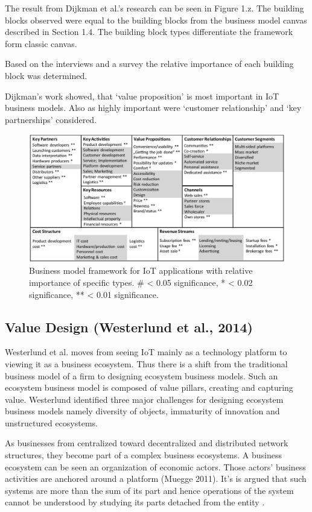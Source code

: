 		The result from Dijkman et al.'s research can be seen in Figure 1.z. The building blocks observed were equal to the building blocks from the business model canvas described in Section 1.4. The building block types differentiate the framework form classic canvas.

		Based on the interviews and a survey the relative importance of each building block was determined. 

		Dijkman's work showed, that `value proposition' is most important in IoT business models. Also as highly important were `customer relationship' and `key  partnerships' considered. 
		\begin{figure}[h]
			\begin{center}
		    \includegraphics[scale=0.52]{Talk11/iot_canvas_rel_imp_dijkman.jpg}
		    \end{center}
		    \caption{Business model framework for IoT applications with relative importance of specific types. \# < 0.05 significance, * < 0.02 significance, **  < 0.01 significance.}
		    \label{Business model for IoT}
		\end{figure}

	\subsection{Value Design (Westerlund et al., 2014)}
		Westerlund et al. moves from seeing IoT mainly as a technology platform to viewing it as a business ecosystem. Thus there is a shift from the traditional business model of a firm to designing ecosystem business models. Such an ecosystem business model is composed of value pillars, creating and capturing value. Westerlund identified three major challenges for designing ecosystem business models namely diversity of objects, immaturity of innovation and unstructured ecosystems.

		As businesses from centralized toward decentralized and distributed network structures, they become part of a complex business ecosystems. A business ecosystem can be seen an organization of economic actors. Those actors' business activities are anchored around a platform (Muegge 2011). It's is argued that such systems are more than the sum of its part and hence operations of the system cannot be understood by studying its parts detached from the entity \cite{westerlund}.

